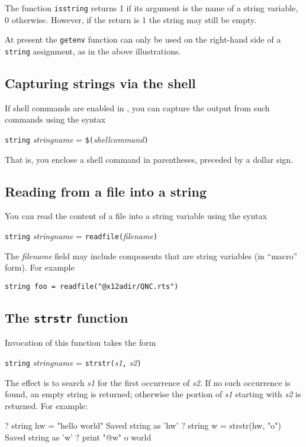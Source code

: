 The function \texttt{isstring} returns 1 if its argument is the name
of a string variable, 0 otherwise.  However, if the return is 1
the string may still be empty.

At present the \texttt{getenv} function can only be used on the
right-hand side of a \texttt{string} assignment, as in the above
illustrations.

\subsection{Capturing strings via the shell}

If shell commands are enabled in , you can capture the
output from such commands using the syntax 

\texttt{string} \textsl{stringname} = \texttt{\$(}\textsl{shellcommand}\texttt{)}

That is, you enclose a shell command in parentheses, preceded by
a dollar sign.

\subsection{Reading from a file into a string}

You can read the content of a file into a string variable using
the syntax

\texttt{string} \textsl{stringname} = \texttt{readfile(}\textsl{filename}\texttt{)}

The \textsl{filename} field may include components that are
string variables (in ``macro'' form).  For example

\verb|string foo = readfile("@x12adir/QNC.rts")|

\subsection{The \texttt{strstr} function}

Invocation of this function takes the form

\texttt{string} \textsl{stringname} = 
\texttt{strstr(}\textsl{s1}\texttt{,} \textsl{s2}\texttt{)}

The effect is to search \textsl{s1} for the first occurrence of
\textsl{s2}.  If no such occurrence is found, an empty string is
returned; otherwise the portion of \textsl{s1} starting with
\textsl{s2} is returned.  For example:
%
\begin{code}
? string hw = "hello world"
Saved string as 'hw'
? string w = strstr(hw, "o")
Saved string as 'w'
? print "@w"
o world
\end{code}
%


    

